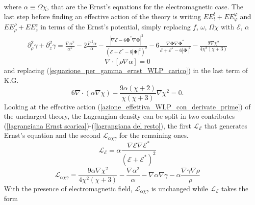 where $\alpha\equiv\Omega\chi$, that are the Ernst's equations for the electromagnetic case. The last step before finding an effective action of the theory is writing $EE^t_t+ EE^{\varphi}_{\varphi}$ and $EE^{\rho}_{\rho}+EE^{z}_{z}$ in terms of the Ernst's potential, simply replacing $f$, $\omega$, $\Omega\chi$ with $\mathcal{E}$, $\alpha$
\begin{align}
    \partial^2_{\rho}\gamma + \partial^2_z \gamma =\frac{\nabla \alpha ^2}{\alpha^2} - 2\frac{\nabla^2\alpha}{\alpha} - \frac{|\nabla\mathcal{E}-6\boldsymbol{\Phi}^*\nabla\boldsymbol{\Phi}|^2}{(\mathcal{E} + \mathcal{E}^*-6|\boldsymbol{\Phi}|^2)^2} -6\frac{\nabla\boldsymbol{\Phi}\nabla\boldsymbol{\Phi}^*}{\mathcal{E} + \mathcal{E}^*-6|\boldsymbol{\Phi}|^2} -\frac{9 \nabla\chi ^2}{4\chi^2(\chi+3)} 
    \label{equazione_per_gamma_ernst_WLP_carico}
\end{align}
\begin{equation}
    \nabla\cdot[\rho\nabla\alpha]=0
    \label{equazione_alpha_WLP_carico}
\end{equation}
and replacing (\ref{equazione_per_gamma_ernst_WLP_carico}) in the last term of K.G. 
\begin{equation}
    6\nabla\cdot(\alpha\nabla\chi) - \frac{9\alpha(\chi +2)}{\chi(\chi + 3)}\nabla\chi^2 = 0.
    \label{K.G._ernst_WLP_carico}
\end{equation}
Looking at the effective action (\ref{azione_effettiva_WLP_con_derivate_prime}) of the uncharged theory, the Lagrangian density can be split in two contributes (\ref{lagrangiana Ernst scarica})-(\ref{lagrangiana del resto}), the first $\mathcal{L}_{\mathcal{E}}$ that generates Ernst's equation and the second $\mathcal{L}_{\alpha \chi \gamma}$ for the remaining ones.
\begin{equation}
    \mathcal{L}_{\mathcal{E}} = \alpha\frac{\nabla\mathcal{E}\nabla\mathcal{E}^*}{(\mathcal{E} + \mathcal{E}^*)^2} 
    \label{lagrangiana Ernst scarica}
\end{equation}
\begin{equation}
    \mathcal{L}_{\alpha \chi \gamma} = \frac{9\alpha\nabla\chi^2}{4\chi^2(\chi+3)} -\frac{\nabla\alpha^2}{\alpha} -\nabla\alpha\nabla\gamma - \alpha\frac{\nabla\gamma\nabla\rho}{\rho}
    \label{lagrangiana del resto}
\end{equation}
With the presence of electromagnetic field, $\mathcal{L}_{\alpha\chi\gamma}$ is unchanged while $\mathcal{L}_{\mathcal{E}}$ takes the form

